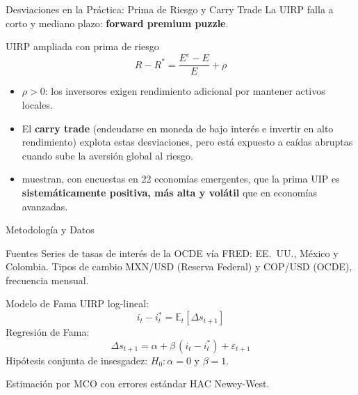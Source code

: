 \documentclass[10pt,professionalfonts,aspectratio=169]{beamer}
\begin{document}
\begin{frame}{Desviaciones en la Práctica: Prima de Riesgo y Carry Trade}
    La UIRP falla a corto y mediano plazo: \textbf{forward premium puzzle}.

    \begin{block}{UIRP ampliada con prima de riesgo}
        \[
            R - R^* = \frac{E^e - E}{E} + \rho
        \]
    \end{block}

    \begin{itemize}
        \item $\rho > 0$: los inversores exigen rendimiento adicional por mantener activos locales.
        \item El \textbf{carry trade} (endeudarse en moneda de bajo interés e invertir en alto rendimiento) explota estas desviaciones, pero está expuesto a caídas abruptas cuando sube la aversión global al riesgo.
        \item \textcite{kalemli2021} muestran, con encuestas en 22 economías emergentes, que la prima UIP es \textbf{sistemáticamente positiva, más alta y volátil} que en economías avanzadas.
    \end{itemize}
\end{frame}

\begin{frame}{Metodología y Datos}
    \begin{block}{Fuentes}
        Series de tasas de interés de la OCDE vía FRED: EE.~UU., México y Colombia. Tipos de cambio MXN/USD (Reserva Federal) y COP/USD (OCDE), frecuencia mensual.
    \end{block}

    \begin{block}{Modelo de Fama \parencite{fama1984}}
        UIRP log-lineal:
        \[
            i_t - i_t^* = \mathbb{E}_t[\Delta s_{t+1}]
        \]
        Regresión de Fama:
        \[
            \Delta s_{t+1} = \alpha + \beta\,(i_t - i_t^*) + \varepsilon_{t+1}
        \]
        Hipótesis conjunta de insesgadez: $H_0: \alpha = 0$ y $\beta = 1$.
    \end{block}

    \footnotesize Estimación por MCO con errores estándar HAC Newey-West.
\end{frame}
\end{document}
